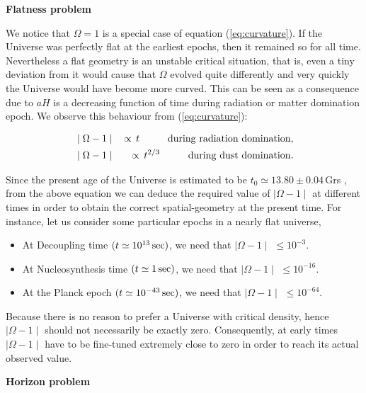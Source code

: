 \documentclass{rmaa}
\def\bea{\begin{eqnarray}}
\def\eea{\end{eqnarray}}
\begin{document}
\textbf{Flatness problem}
\vskip 10pt


We notice that $\Omega=1$ is a special case of equation (\ref{eq:curvature}). 
If the Universe was 
perfectly flat at the earliest epochs,  then it remained so for all time. 
Nevertheless a flat geometry is an unstable
critical situation, that is, even a tiny deviation from it would cause that $\Omega$ evolved 
quite differently and very quickly the Universe would have become more curved. 
This can be seen as a consequence due to $aH$ is a decreasing function of time 
during radiation or matter domination epoch.
We observe this behaviour from (\ref{eq:curvature}):
%

\bea
&\mid \Omega-1\mid & \, \propto \, t  \hspace{1cm} {\rm during\,\,radiation\,\, domination},\nonumber \\ 
&\mid \Omega-1\mid & \, \propto \, t^{2/3}  \hspace{1cm} {\rm during\,\,dust\,\, domination}. \nonumber
\eea

\noindent
Since the present age of the Universe is estimated to be $t_0 \simeq 13.80\pm0.04 
\, $Grs \citep{Apar}, from the above equation we can 
deduce the required value of $\mid \Omega-1\mid$ at different times in order to 
obtain the correct spatial-geometry at the present time. For instance, let us consider some 
particular epochs in a nearly flat universe,

\begin{itemize}
\item At Decoupling time  $(t \simeq 10^{13}\, {\rm sec})$, we need that $\mid \Omega-1 \mid$ $\le 10^{-3}$.
\item  At Nucleosynthesis time $(t \simeq 1\, {\rm sec})$, we need that $\mid \Omega-1 \mid$ $\le 10^{-16}$.
\item  At the Planck epoch $(t \simeq 10^{-43}\, {\rm sec})$, we need that $\mid \Omega-1 \mid$  $\le 10^{-64}$.
\end{itemize}
% 
%
Because there is no reason to prefer a Universe with critical density, hence
$\mid \Omega-1\mid$ should not necessarily be exactly zero. 
Consequently, at early times 
$\mid \Omega-1\mid$ have to be fine-tuned extremely close to zero in order to reach 
its actual observed value.



\vskip 16pt
\textbf{Horizon problem} 
\vskip 10pt
\end{document}
